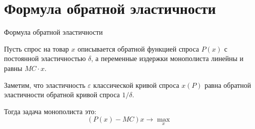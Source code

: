 \documentclass{beamer}
\begin{document}
%
%
%
%
%
%
%
%
%
%
%
%
%

\section{Формула обратной эластичности}

\begin{frame}{Формула обратной эластичности}

Пусть спрос на товар $x$ описывается \alert{обратной функцией спроса} $P(x)$ с постоянной эластичностью $\delta$, а \alert{переменные издержки} монополиста линейны и равны $MC \cdot x$. 

Заметим, что эластичность $\varepsilon$ классической кривой спроса $x(P)$ равна обратной эластичности обратной кривой спроса $1/\delta$. 

Тогда задача монополиста это:
$$ (P(x) - MC)x \to \max_x$$

\end{frame}
\end{document}
